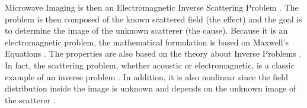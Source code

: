 	Microwave Imaging is then an Electromagnetic Inverse Scattering Problem \citep{chen2017}. The problem is then composed of the known scattered field (the effect) and the goal is to determine the image of the unknown scatterer (the cause). Because it is an electromagnetic problem, the mathematical formulation is based on Maxwell's Equations \citep{jackson1999classical}. The properties are also based on the theory about Inverse Problems \citep{kirsch2011introduction}. In fact, the scattering problem, whether acoustic or electromagnetic, is a classic example of an inverse problem \citep{bertero2020introduction}. In addition, it is also nonlinear since the field distribution inside the image is unknown and depends on the unknown image of the scatterer \citep{colton2019inverse}.
	
